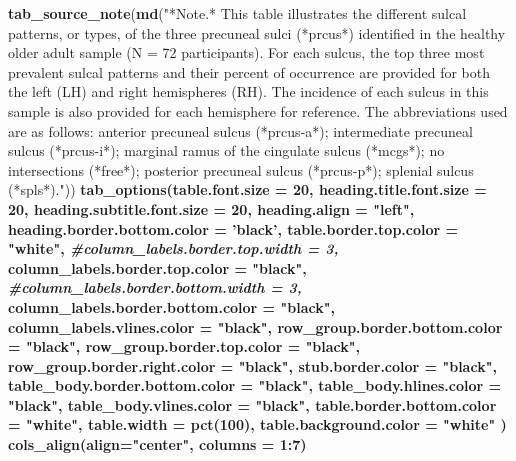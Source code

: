 \documentclass[
]{article}
\newenvironment{Shaded}{\begin{snugshade}}{\end{snugshade}}
\newcommand{\CommentTok}[1]{\textcolor[rgb]{0.56,0.35,0.01}{\textit{#1}}}
\newcommand{\DataTypeTok}[1]{\textcolor[rgb]{0.13,0.29,0.53}{#1}}
\newcommand{\DecValTok}[1]{\textcolor[rgb]{0.00,0.00,0.81}{#1}}
\newcommand{\KeywordTok}[1]{\textcolor[rgb]{0.13,0.29,0.53}{\textbf{#1}}}
\newcommand{\NormalTok}[1]{#1}
\newcommand{\OperatorTok}[1]{\textcolor[rgb]{0.81,0.36,0.00}{\textbf{#1}}}
\newcommand{\StringTok}[1]{\textcolor[rgb]{0.31,0.60,0.02}{#1}}
\begin{document}
\begin{Shaded}
\begin{Highlighting}[]
{{{{{{{{{\KeywordTok{tab_source_note}\NormalTok{(}\KeywordTok{md}\NormalTok{(}\StringTok{"*Note.* This table illustrates the different sulcal patterns, or types, of the three precuneal sulci (*prcus*) identified in the healthy older adult sample (N = 72 participants). For each sulcus, the top three most prevalent sulcal patterns and their percent of occurrence are provided for both the left (LH) and right hemispheres (RH). The incidence of each sulcus in this sample is also provided for each hemisphere for reference. The abbreviations used are as follows: anterior precuneal sulcus (*prcus-a*); intermediate precuneal sulcus (*prcus-i*); marginal ramus of the cingulate sulcus (*mcgs*); no intersections (*free*); posterior precuneal sulcus (*prcus-p*); splenial sulcus (*spls*)."}\NormalTok{)) }\OperatorTok{%>%}
\StringTok{  }\KeywordTok{tab_options}\NormalTok{(}\DataTypeTok{table.font.size =} \DecValTok{20}\NormalTok{,}
    \DataTypeTok{heading.title.font.size =} \DecValTok{20}\NormalTok{,}
    \DataTypeTok{heading.subtitle.font.size =} \DecValTok{20}\NormalTok{,}
    \DataTypeTok{heading.align =} \StringTok{"left"}\NormalTok{,}
    \DataTypeTok{heading.border.bottom.color =} \StringTok{'black'}\NormalTok{,}
    \DataTypeTok{table.border.top.color =} \StringTok{"white"}\NormalTok{,}
    \CommentTok{#column_labels.border.top.width = 3,}
    \DataTypeTok{column_labels.border.top.color =} \StringTok{"black"}\NormalTok{,}
    \CommentTok{#column_labels.border.bottom.width = 3,}
    \DataTypeTok{column_labels.border.bottom.color =} \StringTok{"black"}\NormalTok{,}
    \DataTypeTok{column_labels.vlines.color =} \StringTok{"black"}\NormalTok{,}
    \DataTypeTok{row_group.border.bottom.color =} \StringTok{"black"}\NormalTok{,}
    \DataTypeTok{row_group.border.top.color =} \StringTok{"black"}\NormalTok{,}
    \DataTypeTok{row_group.border.right.color =} \StringTok{"black"}\NormalTok{,}
    \DataTypeTok{stub.border.color =} \StringTok{"black"}\NormalTok{,}
    \DataTypeTok{table_body.border.bottom.color =} \StringTok{"black"}\NormalTok{,}
    \DataTypeTok{table_body.hlines.color =} \StringTok{"black"}\NormalTok{,}
    \DataTypeTok{table_body.vlines.color =} \StringTok{"black"}\NormalTok{,}
    \DataTypeTok{table.border.bottom.color =} \StringTok{"white"}\NormalTok{,}
    \DataTypeTok{table.width =} \KeywordTok{pct}\NormalTok{(}\DecValTok{100}\NormalTok{),}
    \DataTypeTok{table.background.color =} \StringTok{"white"}
\NormalTok{  ) }\OperatorTok{%>%}
\StringTok{  }\KeywordTok{cols_align}\NormalTok{(}\DataTypeTok{align=}\StringTok{"center"}\NormalTok{, }\DataTypeTok{columns =} \DecValTok{1}\OperatorTok{:}\DecValTok{7}\NormalTok{) }\OperatorTok{%>%}
}}}}}}}}}}}}
\end{Highlighting}
\end{Shaded}
\end{document}
